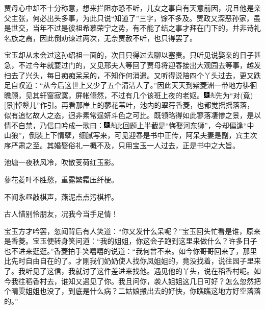 贾母心中却不十分称意，想来拦阻亦恐不听，儿女之事自有天意前因，况且他是亲父主张，何必出头多事，为此只说“知道了”三字，馀不多及。贾政又深恶孙家，虽是世交，当年不过是彼祖希慕荣宁之势，有不能了结之事才拜在门下的，并非诗礼名族之裔，因此倒劝谏过两次，无奈贾赦不听，也只得罢了。

宝玉却从未会过这孙绍祖一面的，次日只得过去聊以塞责。只听见说娶亲的日子甚急，不过今年就要过门的，又见邢夫人等回了贾母将迎春接出大观园去等事，越发扫去了兴头，每日痴痴呆呆的，不知作何消遣。又听得说陪四个丫头过去，更又跌足自叹道：“从今后这世上又少了五个清洁人了。”因此天天到紫菱洲一带地方徘徊瞻顾，见其轩窗寂寞，屏帐翛然，不过有几个该班上夜的老妪。{\includegraphics[width=3mm]{../Images/00004}\includegraphics[width=3mm]{../Images/00012}\footnotesize \kaishu 先为“对{(竟)}{[}景{]}悼颦儿”作引。}再看那岸上的蓼花苇叶，池内的翠荇香菱，也都觉摇摇落落，似有追忆故人之态，迥非素常逞妍斗色之可比。既领略得如此寥落凄惨之景，是以情不自禁，乃信口吟成一歌曰：{\includegraphics[width=3mm]{../Images/00004}\includegraphics[width=3mm]{../Images/00012}\footnotesize \kaishu 此回题上半截是“悔娶河东狮”，今却偏逢“中山狼”，倒装上下情孽，细腻写来，可见迎春是书中正传，阿呆夫妻是副，宾主次序严肃之至。其婚娶俗礼一概不及，只用宝玉一人过去，正是书中之大旨。}

池塘一夜秋风冷，吹散芰荷红玉影。

蓼花菱叶不胜愁，重露繁霜压纤梗。

不闻永昼敲棋声，燕泥点点污棋枰。

古人惜别怜朋友，况我今当手足情！

宝玉方才吟罢，忽闻背后有人笑道：“你又发什么呆呢？”宝玉回头忙看是谁，原来是香菱。宝玉便转身笑问道：“我的姐姐，你这会子跑到这里来做什么？许多日子也不进来逛逛。”香菱拍手笑嘻嘻的说道：“我何曾不来。如今你哥哥回来了，那里比先时自由自在的了。才刚我们奶奶使人找你凤姐姐的，竟没找着，说往园子里来了。我听见了这信，我就讨了这件差进来找他。遇见他的丫头，说在稻香村呢。如今我往稻香村去，谁知又遇见了你。我且问你，袭人姐姐这几日可好？怎么忽然把个晴雯姐姐也没了，到底是什么病？二姑娘搬出去的好快，你瞧瞧这地方好空落落的。”


